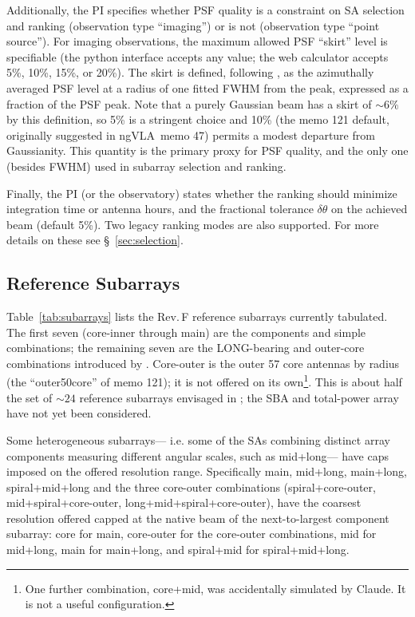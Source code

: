 \documentclass[11pt]{article}
\newcommand{\ngvla}{ngVLA}
\begin{document}
Additionally, the PI specifies whether PSF quality is a constraint on
SA selection and ranking (observation type ``imaging'') or is not
(observation type ``point source'').  For imaging observations, the
maximum allowed PSF ``skirt'' level is specifiable (the python
interface accepts any value; the web calculator accepts 5\%, 10\%,
15\%, or 20\%).  The skirt is defined, following \citep{memo106}, as
the azimuthally averaged PSF level at a radius of one fitted FWHM from
the peak, expressed as a fraction of the PSF peak.  Note that a purely
Gaussian beam has a skirt of $\sim 6\%$ by this definition, so 5\% is
a stringent choice and 10\% (the memo 121 default, originally
suggested in \ngvla\ memo 47) permits a modest departure from
Gaussianity.  This quantity is the primary proxy for PSF quality, and
the only one (besides FWHM) used in subarray selection and ranking.

Finally, the PI (or the observatory) states whether the ranking should
minimize integration time or antenna hours, and the fractional
tolerance $\delta \theta$ on the achieved beam (default 5\%). Two
legacy ranking modes are also supported. For more details on these
see \S~\ref{sec:selection}.

\subsection{Reference Subarrays}
\label{sec:refsa}

Table~\ref{tab:subarrays} lists the Rev.\,F reference subarrays
currently tabulated.  The first seven (core-inner through main) are
the components and simple combinations; the remaining seven are the
LONG-bearing and outer-core combinations introduced by
\citep{memo121}.  Core-outer is the outer 57 core antennas by radius
(the ``outer50core'' of memo 121); it is not offered on its
own\footnote{One further combination, core+mid, was accidentally
simulated by Claude. It is not a useful configuration.}.  This is
about half the set of $\sim 24$ reference subarrays envisaged in
\citep{saNarrative}; the SBA and total-power array have not yet been
considered.

Some heterogeneous subarrays--- i.e. some of the SAs combining
distinct array components measuring different angular scales, such as
mid+long--- have caps imposed on the offered resolution
range. Specifically main, mid+long, main+long, spiral+mid+long and the
three core-outer combinations (spiral+core-outer,
mid+spiral+core-outer, long+mid+spiral+core-outer), have the coarsest
resolution offered capped at the native beam of the next-to-largest
component subarray: core for main, core-outer for the core-outer
combinations, mid for mid+long, main for main+long, and spiral+mid for
spiral+mid+long.
\end{document}
